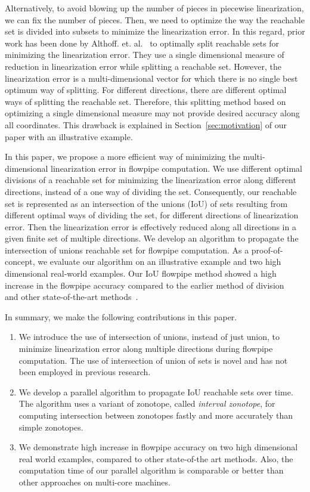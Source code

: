 Alternatively, to avoid blowing up the number of pieces in piecewise
linearization, we can fix the number of pieces.  Then, we need to
optimize the way the reachable set is divided into subsets to minimize
the linearization error.  In this regard, prior work has been done by
Althoff. et. al.~\cite{althoff2008reachability} to optimally split
reachable sets for minimizing the linearization error.  They use a
single dimensional measure of reduction in linearization error while
splitting a reachable set.  However, the linearization error is a
multi-dimensional vector for which there is no single best optimum way
of splitting.  For different directions, there are different optimal
ways of splitting the reachable set.  Therefore, this splitting method
based on optimizing a single dimensional measure may not provide
desired accuracy along all coordinates.  This drawback is explained in
Section~\ref{sec:motivation} of our paper with an illustrative
example.

In this paper, we propose a more efficient way of minimizing the
multi-dimensional linearization error in flowpipe computation.  We use
different optimal divisions of a reachable set for minimizing the
linearization error along different directions, instead of a one way
of dividing the set.  Consequently, our reachable set is represented
as an intersection of the unions (IoU) of sets resulting from
different optimal ways of dividing the set, for different directions
of linearization error.  Then the linearization error is effectively
reduced along all directions in a given finite set of multiple
directions.  We develop an algorithm to propagate the intersection of
unions reachable set for flowpipe computation.  As a proof-of-concept,
we evaluate our algorithm on an illustrative example and two high
dimensional real-world examples. Our IoU flowpipe method showed a high
increase in the flowpipe accuracy compared to the earlier method of
division~~\cite{althoff2008reachability} and other state-of-the-art
methods~\cite{chen2012taylor,althoff2013reachability}.

In summary, we make the following contributions in this paper.
\begin{enumerate}
\item We introduce the use of intersection of unions, instead of
    just union, to minimize linearization error along multiple
    directions during flowpipe computation.  The use of intersection
    of union of sets is novel and has not been employed in previous
    research.
%
\item We develop a parallel algorithm to propagate IoU reachable sets
    over time.  The algorithm uses a variant of zonotope,
    called \emph{interval zonotope}, for computing intersection
    between zonotopes fastly and more accurately than simple zonotopes.
%
\item We demonstrate high increase in flowpipe accuracy on two high
    dimensional real world examples, compared to other state-of-the
    art methods.  Also, the computation time of our parallel
    algorithm is comparable or better than other approaches on
    multi-core machines.
\end{enumerate}
%
